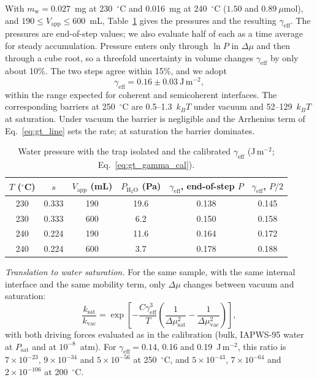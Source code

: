 With $m_{\mathrm{w}} = 0.027$~mg at 230~$^\circ$C and 0.016~mg at 240~$^\circ$C ($1.50$ and
$0.89~\mu$mol), and $190\le V_{\mathrm{app}}\le600$~mL, Table~\ref{tab:gt_gamma} gives the pressures
and the resulting $\gamma_{\mathrm{eff}}$. The pressures are end-of-step values; we also evaluate half
of each as a time average for steady accumulation. Pressure enters only through $\ln P$ in
$\Delta\mu$ and then through a cube root, so a threefold uncertainty in volume changes
$\gamma_{\mathrm{eff}}$ by only about 10\%. The two steps agree within 15\%, and we adopt
\begin{equation}
  \gamma_{\mathrm{eff}} = 0.16\pm0.03~\mathrm{J\,m^{-2}} ,
\end{equation}
within the range expected for coherent and semicoherent interfaces. The corresponding barriers at
250~$^\circ$C are 0.5--1.3~$k_BT$ under vacuum and 52--129~$k_BT$ at saturation. Under vacuum the
barrier is negligible and the Arrhenius term of Eq.~\eqref{eq:gt_line} sets the rate; at saturation
the barrier dominates.

\begin{table}[htbp]
  \centering
  \caption{Water pressure with the trap isolated and the calibrated $\gamma_{\mathrm{eff}}$ (J\,m$^{-2}$; Eq.~\eqref{eq:gt_gamma_cal}).}
  \label{tab:gt_gamma}
  \begin{tabular}{cccccc}
    \hline
    $T$ ($^\circ$C) & $s$ & $V_{\mathrm{app}}$ (mL) & $P_{\mathrm{H_2O}}$ (Pa) & $\gamma_{\mathrm{eff}}$, end-of-step $P$ & $\gamma_{\mathrm{eff}}$, $P/2$ \\
    \hline
    230 & 0.333 & 190 & 19.6 & 0.138 & 0.145 \\
    230 & 0.333 & 600 & 6.2  & 0.150 & 0.158 \\
    240 & 0.224 & 190 & 11.6 & 0.164 & 0.172 \\
    240 & 0.224 & 600 & 3.7  & 0.178 & 0.188 \\
    \hline
  \end{tabular}
\end{table}

\textit{Translation to water saturation.} For the same sample, with the same internal interface
and the same mobility term, only $\Delta\mu$ changes between vacuum and saturation:
\begin{equation}
  \frac{k_{\mathrm{sat}}}{k_{\mathrm{vac}}} = \exp\!\left[-\frac{C\gamma_{\mathrm{eff}}^{3}}{T}\left(\frac{1}{\Delta\mu_{\mathrm{sat}}^{2}} - \frac{1}{\Delta\mu_{\mathrm{vac}}^{2}}\right)\right],
  \label{eq:gt_translate}
\end{equation}
with both driving forces evaluated as in the calibration (bulk, IAPWS-95 water at $P_{\mathrm{sat}}$ and
at $10^{-8}$~atm). For $\gamma_{\mathrm{eff}} = 0.14$, 0.16 and 0.19~J\,m$^{-2}$, this ratio is
$7\times10^{-23}$, $9\times10^{-34}$ and $5\times10^{-56}$ at 250~$^\circ$C, and $5\times10^{-43}$,
$7\times10^{-64}$ and $2\times10^{-106}$ at 200~$^\circ$C.

